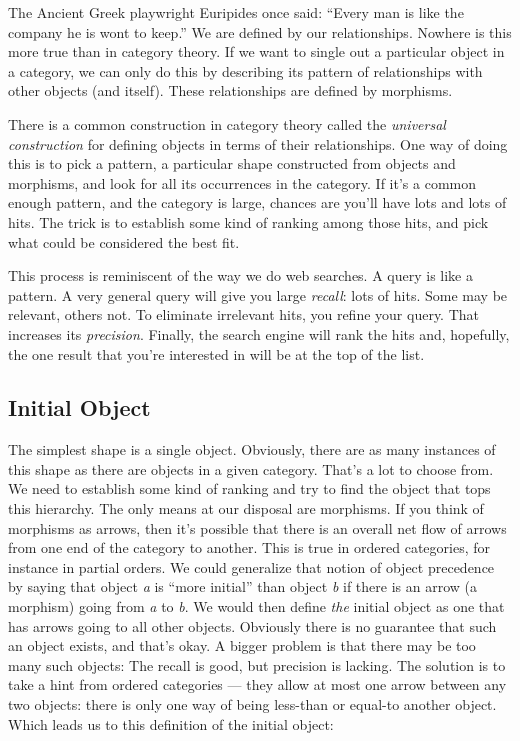 The Ancient Greek playwright Euripides once said: ``Every man is like
the company he is wont to keep.'' We are defined by our relationships.
Nowhere is this more true than in category theory. If we want to single
out a particular object in a category, we can only do this by describing
its pattern of relationships with other objects (and itself). These
relationships are defined by morphisms.

There is a common construction in category theory called the
\emph{universal construction} for defining objects in terms of their
relationships. One way of doing this is to pick a pattern, a particular
shape constructed from objects and morphisms, and look for all its
occurrences in the category. If it's a common enough pattern, and the
category is large, chances are you'll have lots and lots of hits. The
trick is to establish some kind of ranking among those hits, and pick
what could be considered the best fit.

This process is reminiscent of the way we do web searches. A query is
like a pattern. A very general query will give you large \emph{recall}:
lots of hits. Some may be relevant, others not. To eliminate irrelevant
hits, you refine your query. That increases its \emph{precision}.
Finally, the search engine will rank the hits and, hopefully, the one
result that you're interested in will be at the top of the list.

\subsection{Initial Object}\label{initial-object}

The simplest shape is a single object. Obviously, there are as many
instances of this shape as there are objects in a given category. That's
a lot to choose from. We need to establish some kind of ranking and try
to find the object that tops this hierarchy. The only means at our
disposal are morphisms. If you think of morphisms as arrows, then it's
possible that there is an overall net flow of arrows from one end of the
category to another. This is true in ordered categories, for instance in
partial orders. We could generalize that notion of object precedence by
saying that object \emph{a} is ``more initial'' than object \emph{b} if
there is an arrow (a morphism) going from \emph{a} to \emph{b}. We would
then define \emph{the} initial object as one that has arrows going to
all other objects. Obviously there is no guarantee that such an object
exists, and that's okay. A bigger problem is that there may be too many
such objects: The recall is good, but precision is lacking. The solution
is to take a hint from ordered categories --- they allow at most one
arrow between any two objects: there is only one way of being less-than
or equal-to another object. Which leads us to this definition of the
initial object:

